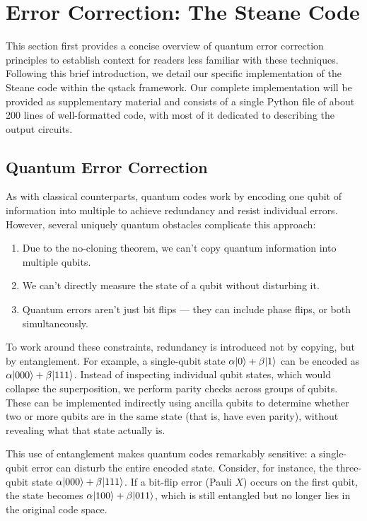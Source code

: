 \section{Error Correction: The Steane Code}\label{sec:error-correction}

This section first provides a concise overview of quantum error correction principles to establish context for readers less familiar with these techniques. Following this brief introduction, we detail our specific implementation of the Steane code within the qstack framework. Our complete implementation will be provided as supplementary material and consists of a single Python file of about 200 lines of well-formatted code, with most of it dedicated to describing the output circuits.

\subsection{Quantum Error Correction}

As with classical counterparts, quantum codes work by encoding one qubit of information into multiple to achieve redundancy and resist individual errors. However, several uniquely quantum obstacles complicate this approach:

\begin{enumerate}
\item Due to the no-cloning theorem, we can’t copy quantum information into multiple qubits.
\item We can’t directly measure the state of a qubit without disturbing it.
\item Quantum errors aren’t just bit flips — they can include phase flips, or both simultaneously.
\end{enumerate}

To work around these constraints, redundancy is introduced not by copying, but by entanglement. For example, a single-qubit state $\alpha |0\rangle + \beta |1\rangle$ can be encoded as $\alpha |000\rangle + \beta |111\rangle$. Instead of inspecting individual qubit states, which would collapse the superposition, we perform parity checks across groups of qubits. These can be implemented indirectly using ancilla qubits to determine whether two or more qubits are in the same state (that is, have even parity), without revealing what that state actually is.

This use of entanglement makes quantum codes remarkably sensitive: a single-qubit error can disturb the entire encoded state. Consider, for instance, the three-qubit state $\alpha |000\rangle + \beta |111\rangle$. If a bit-flip error (Pauli $X$) occurs on the first qubit, the state becomes $\alpha |100\rangle + \beta |011\rangle$, which is still entangled but no longer lies in the original code space.

